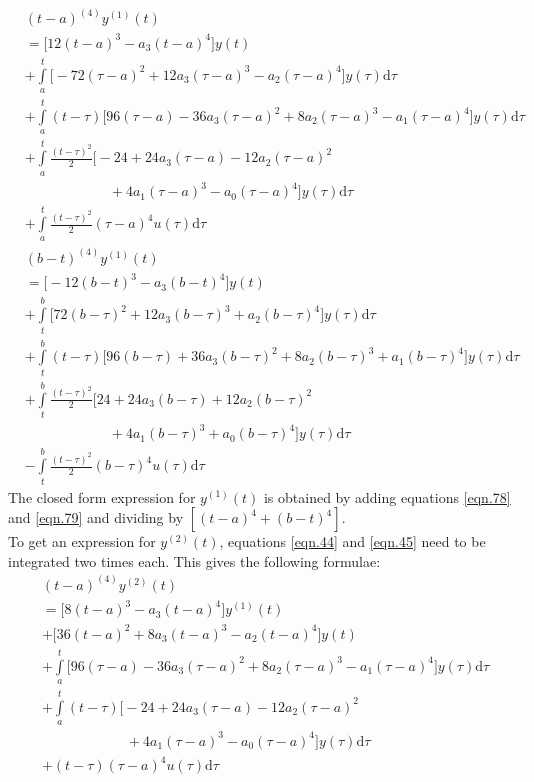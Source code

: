 \documentclass{article}
\begin{document}
\begin{equation}\label{eqn.78}
\begin{split}
	&(t-a)^{(4)}y^{(1)}(t)\\
	&=\bigg[ 12(t-a)^{3}-a_3(t-a)^{4}\bigg]y(t)\\
	&+\int\limits_{a}^{t}\bigg[-72(\tau-a)^{2}+12a_3(\tau-a)^{3}-a_2(\tau-a)^4\bigg]y(\tau)\mathrm{d}\tau\\
	&+\int\limits_{a}^{t}(t-\tau)\bigg[96(\tau-a)-36a_3(\tau-a)^{2}+8a_2(\tau-a)^{3}-a_1(\tau-a)^{4}\bigg]y(\tau)\mathrm{d}\tau\\
	&+\int\limits_{a}^{t}\frac{(t-\tau)^{2}}{2}\bigg[-24+24a_3(\tau-a)-12a_2(\tau-a)^{2}
	\\&\qquad\qquad\qquad{}+4a_1(\tau-a)^{3}-a_0(\tau-a)^{4}\bigg]y(\tau)\mathrm{d}\tau\\
	&+\int\limits_{a}^{t}\frac{(t-\tau)^{2}}{2}(\tau-a)^{4}u(\tau)\mathrm{d}\tau	
\end{split}
\end{equation}
\begin{equation}\label{eqn.79}
\begin{split}
	&(b-t)^{(4)}y^{(1)}(t)\\
	&=\bigg[-12(b-t)^{3}-a_3(b-t)^{4} \bigg]y(t)\\
	&+\int\limits_{t}^{b}\bigg[72(b-\tau)^{2}+12a_3(b-\tau)^{3}+a_2(b-\tau)^4\bigg]y(\tau)\mathrm{d}\tau\\
	&+\int\limits_{t}^{b}(t-\tau)\bigg[96(b-\tau)+36a_3(b-\tau)^{2}+8a_2(b-\tau)^{3}+a_1(b-\tau)^{4}\bigg]y(\tau)\mathrm{d}\tau\\
	&+\int\limits_{t}^{b}\frac{(t-\tau)^{2}}{2}\bigg[24+24a_3(b-\tau)+12a_2(b-\tau)^{2}
	\\&\qquad\qquad\qquad{}+4a_1(b-\tau)^{3}+a_0(b-\tau)^{4}\bigg]y(\tau)\mathrm{d}\tau\\
	&-\int\limits_{t}^{b}\frac{(t-\tau)^{2}}{2}(b-\tau)^{4}u(\tau)\mathrm{d}\tau	
\end{split}
\end{equation}
The closed form expression for $y^{(1)}(t)$ is obtained by adding equations \eqref{eqn.78} and \eqref{eqn.79} and dividing by $[(t-a)^{4}+(b-t)^{4}]$.\\
To get an expression for $y^{(2)}(t)$, equations \eqref{eqn.44} and \eqref{eqn.45} need to be integrated two times each. This gives the following formulae:
\begin{equation}\label{eqn.80}
\begin{split}
	&(t-a)^{(4)}y^{(2)}(t)\\
	&=\bigg[8(t-a)^{3}-a_3(t-a)^{4}\bigg]y^{(1)}(t)\\&+\bigg[36(t-a)^{2}+8a_3(t-a)^{3}-a_2(t-a)^{4}\bigg]y(t)\\
	&+\int\limits_{a}^{t}\bigg[96(\tau-a)-36a_3(\tau-a)^{2}+8a_2(\tau-a)^{3}-a_1(\tau-a)^{4}\bigg]y(\tau)\mathrm{d}\tau\\
	&+\int\limits_{a}^{t}(t-\tau)\bigg[-24+24a_3(\tau-a)-12a_2(\tau-a)^{2}
	\\&\qquad\qquad\qquad{}+4a_1(\tau-a)^{3}-a_0(\tau-a)^{4}\bigg]y(\tau)\mathrm{d}\tau\\
	&+(t-\tau)(\tau-a)^{4}u(\tau)\mathrm{d}\tau
\end{split}
\end{equation}
\end{document}

